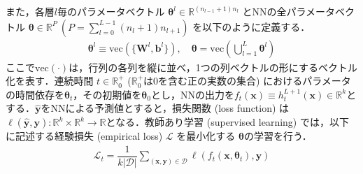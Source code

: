 また，各層$l$毎のパラメータベクトル $\bm{\theta}^l \in \mathbb{R}^{(n_{l-1}+1)n_l}$ とNNの全パラメータベクトル $\bm{\theta} \in \mathbb{R}^P \ (P=\sum_{l=0}^{L-1}(n_{l}+1)n_{l+1})$ を以下のように定義する．
\begin{align}
    \bm{\theta}^{l} \equiv \mbox{vec}\left(\{\bm{W}^{l}, \bm{b}^{l}\}\right), \quad \bm{\theta} = \mbox{vec}\left(\bigcup_{l=1}^L \bm{\theta}^l\right)
\end{align}
ここで$\mbox{vec}(\cdot)$は，行列の各列を縦に並べ，1つの列ベクトルの形にするベクトル化を表す．連続時間 $t \in \mathbb{R}_0^{+}$ ($\mathbb{R}_0^{+}$は0を含む正の実数の集合)  におけるパラメータの時間依存を$\bm{\theta}_t$，その初期値を$\bm{\theta}_0$とし，NNの出力を$f_t(\bm{x}) \equiv h_t^{L+1}(\bm{x}) \in \mathbb{R}^{k}$とする．$\hat{\bm{y}}$をNNによる予測値とすると，損失関数 (loss function) は$\ell (\hat{\bm{y}}, \bm{y}):\mathbb{R}^{k} \times \mathbb{R}^k \rightarrow \mathbb{R}$となる．教師あり学習 (supervised learning) では，以下に記述する経験損失 (empirical loss) $\mathcal{L}$ を最小化する $\bm{\theta}$の学習を行う．
\begin{align}
    \mathcal{L}_t = \dfrac{1}{k|\mathcal{D}|}\sum_{(\bm{x},\bm{y}) \in \mathcal{D}} \ell(f_t(\bm{x},\bm{\theta}_t), \bm{y})
\end{align}